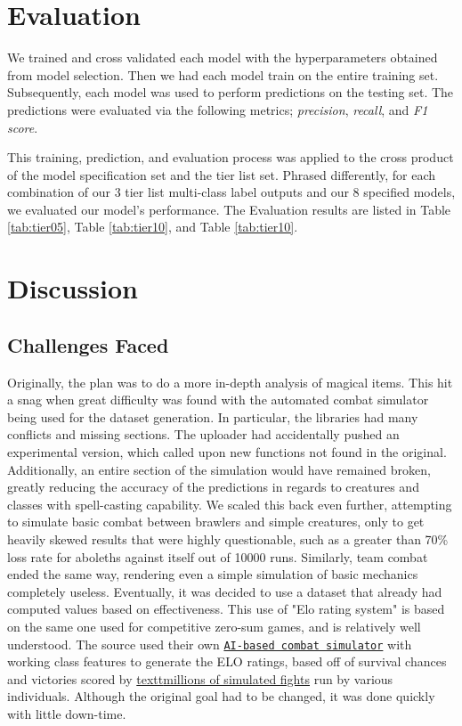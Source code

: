 \documentclass[12pt]{diazessay}
\begin{document}
\section{Evaluation}

We trained and cross validated each model with the hyperparameters obtained from model selection.
Then we had each model train on the entire training set.
Subsequently, each model was used to perform predictions on the testing set.
The predictions were evaluated via the following metrics; \emph{precision}, \emph{recall}, and \emph{F1 score}.

This training, prediction, and evaluation process was applied to the cross product of the model specification set and the tier list set.
Phrased differently, for each combination of our $3$ tier list multi-class label outputs and our $8$ specified models, we evaluated our model's performance.
The Evaluation results are listed in Table \ref{tab:tier05}, Table \ref{tab:tier10}, and Table \ref{tab:tier10}.


\section{Discussion}

\subsection{Challenges Faced}
\label{sec:challenges}

Originally, the plan was to do a more in-depth analysis of magical items. This hit a snag when great difficulty was found with the automated combat simulator being used for the dataset generation. In particular, the libraries had many conflicts and missing sections. The uploader had accidentally pushed an experimental version, which called upon new functions not found in the original. Additionally, an entire section of the simulation would have remained broken, greatly reducing the accuracy of the predictions in regards to creatures and classes with spell-casting capability. We scaled this back even further, attempting to simulate basic combat between brawlers and simple creatures, only to get heavily skewed results that were highly questionable, such as a greater than 70\% loss rate for aboleths against itself out of 10000 runs. Similarly, team combat ended the same way, rendering even a simple simulation of basic mechanics completely useless.
\newline
Eventually, it was decided to use a dataset that already had computed values based on effectiveness. This use of "Elo rating system" is based on the same one used for competitive zero-sum games, and is relatively well understood. The source used their own \href{https://www.dndcombat.com/dndcombat/Welcome.do}{\texttt{AI-based combat simulator}} with working class features to generate the ELO ratings, based off of survival chances and victories scored by \href{https://www.dndcombat.com/code_updates.html?v=3.51}{textt{millions of simulated fights}} run by various individuals. Although the original goal had to be changed, it was done quickly with little down-time.
\newline
\end{document}
